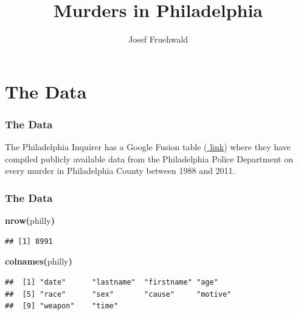 \documentclass[]{beamer}
\title{Murders in Philadelphia}
\author{Josef Fruehwald}
\makeatletter
\newcommand{\hlfunctioncall}[1]{\textcolor[rgb]{.5,0,.33}{\textbf{#1}}}%
\newcommand{\hlkeyword}[1]{\textbf{#1}}%
\newcommand{\hlsymbol}[1]{#1}%
\newenvironment{kframe}{%
 \def\FrameCommand##1{\hskip\@totalleftmargin \hskip-\fboxsep
 \colorbox{shadecolor}{##1}\hskip-\fboxsep
     \hskip-\linewidth \hskip-\@totalleftmargin \hskip\columnwidth}%
 \MakeFramed {\advance\hsize-\width
   \@totalleftmargin\z@ \linewidth\hsize
   \@setminipage}}%
 {\par\unskip\endMakeFramed}
\newenvironment{knitrout}{}{} %
\renewenvironment{knitrout}{\begin{footnotesize}}{\end{footnotesize}}
\makeatother
\begin{document}

\begin{frame}
	\titlepage
\end{frame}

\section{The Data}


\begin{frame}
	\frametitle{The Data}

	The Philadelphia Inquirer has a Google Fusion table
	(\href{https://www.google.com/fusiontables/DataSource?snapid=S4035208e94}{\color{red} link}) 
	where they have compiled publicly available data from the Philadelphia Police Department on
	every murder in Philadelphia County between 1988 and 2011.
	
\end{frame}







\begin{frame}[fragile]
	\frametitle{The Data}
\begin{knitrout}
\color{fgcolor}\begin{kframe}
\begin{flushleft}
\ttfamily\noindent
\hlfunctioncall{nrow}\hlkeyword{(}\hlsymbol{philly}\hlkeyword{)}\mbox{}
\normalfont
\end{flushleft}
\begin{verbatim}
## [1] 8991
\end{verbatim}
\begin{flushleft}
\ttfamily\noindent
\hlfunctioncall{colnames}\hlkeyword{(}\hlsymbol{philly}\hlkeyword{)}\mbox{}
\normalfont
\end{flushleft}
\begin{verbatim}
##  [1] "date"      "lastname"  "firstname" "age"      
##  [5] "race"      "sex"       "cause"     "motive"   
##  [9] "weapon"    "time"     
\end{verbatim}
\end{kframe}
\end{knitrout}

\end{frame}
\end{document}

